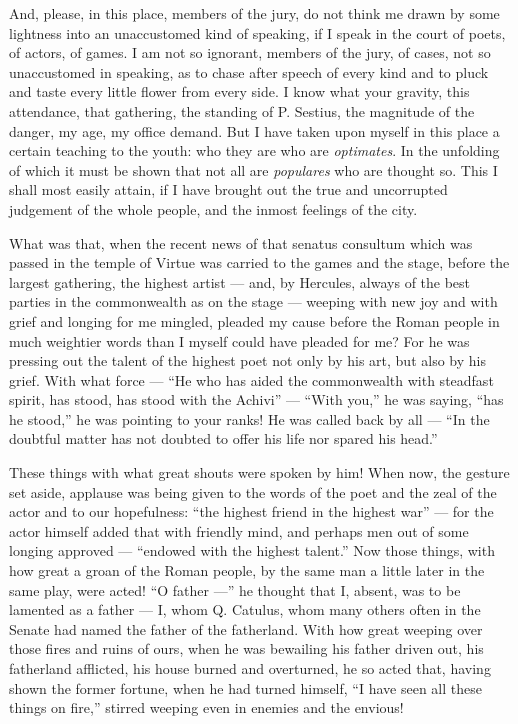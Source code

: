  And, please, in this place, members of the jury, do not think me drawn by some lightness into an unaccustomed kind of speaking, if I speak in the court of poets, of actors, of games. I am not so ignorant, members of the jury, of cases, not so unaccustomed in speaking, as to chase after speech of every kind and to pluck and taste every little flower from every side. I know what your gravity, this attendance, that gathering, the standing of P. Sestius, the magnitude of the danger, my age, my office demand. But I have taken upon myself in this place a certain teaching to the youth: who they are who are \textit{optimates}. In the unfolding of which it must be shown that not all are \textit{populares} who are thought so. This I shall most easily attain, if I have brought out the true and uncorrupted judgement of the whole people, and the inmost feelings of the city.

 What was that, when the recent news of that senatus consultum which was passed in the temple of Virtue was carried to the games and the stage, before the largest gathering, the highest artist --- and, by Hercules, always of the best parties in the commonwealth as on the stage --- weeping with new joy and with grief and longing for me mingled, pleaded my cause before the Roman people in much weightier words than I myself could have pleaded for me? For he was pressing out the talent of the highest poet not only by his art, but also by his grief. With what force --- ``He who has aided the commonwealth with steadfast spirit, has stood, has stood with the Achivi'' --- ``With you,'' he was saying, ``has he stood,'' he was pointing to your ranks! He was called back by all --- ``In the doubtful matter has not doubted to offer his life nor spared his head.''

 These things with what great shouts were spoken by him! When now, the gesture set aside, applause was being given to the words of the poet and the zeal of the actor and to our hopefulness: ``the highest friend in the highest war'' --- for the actor himself added that with friendly mind, and perhaps men out of some longing approved --- ``endowed with the highest talent.'' Now those things, with how great a groan of the Roman people, by the same man a little later in the same play, were acted! ``O father ---'' he thought that I, absent, was to be lamented as a father --- I, whom Q. Catulus, whom many others often in the Senate had named the father of the fatherland. With how great weeping over those fires and ruins of ours, when he was bewailing his father driven out, his fatherland afflicted, his house burned and overturned, he so acted that, having shown the former fortune, when he had turned himself, ``I have seen all these things on fire,'' stirred weeping even in enemies and the envious!

